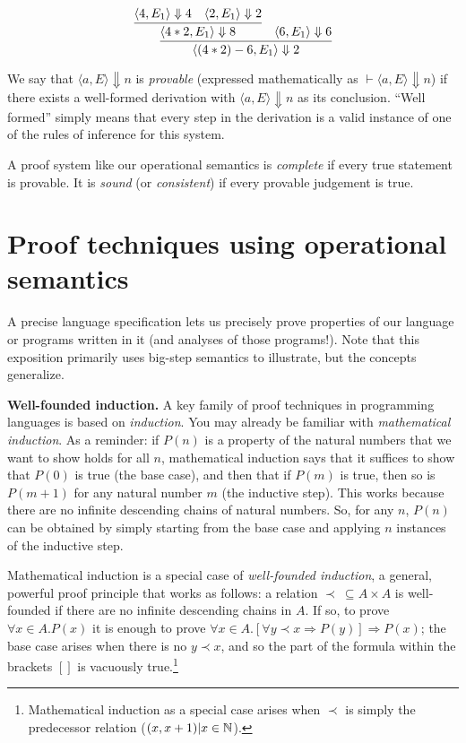 \documentclass[11pt]{article}
\begin{document}
\begin{equation*}
\infer{\langle (4 * 2) - 6, E_1 \rangle \Downarrow 2}
{\infer{\langle 4 * 2, E_1 \rangle \Downarrow 8}{\langle 4,E_1 \rangle \Downarrow 4& \langle 2,E_1 \rangle \Downarrow 2}
& \langle 6, E_1 \rangle \Downarrow 6}
\end{equation*}

We say that $\langle a, E \rangle \Downarrow n$ is \emph{provable} (expressed
mathematically as $\vdash \langle a,E \rangle \Downarrow n$) if there exists a
well-formed derivation with $\langle a, E \rangle \Downarrow n$ as its
conclusion.  ``Well formed'' simply means that every step in the derivation is a
valid instance of one of the rules of inference for this system.

A proof system like our operational semantics is \emph{complete} if every true
statement is provable.  It is \emph{sound} (or \emph{consistent}) if every
provable judgement is true.
%

\section{Proof techniques using operational semantics}

A precise language specification lets us precisely prove properties of our
language or programs written in it (and analyses of those programs!).  Note that
this exposition primarily uses big-step semantics to illustrate, but the concepts
generalize. 

\vspace{1ex}
\noindent\textbf{Well-founded induction.}
A key family of proof techniques in programming languages is based on
\emph{induction}.  You may already be familiar with \emph{mathematical
  induction}. As a reminder: if $P(n)$ is a property of the natural numbers that
we want to show holds for all $n$, mathematical induction says that it suffices
to show that $P(0)$ is true (the base case), and then that if $P(m)$ is true,
then so is $P(m + 1)$ for any natural number $m$ (the inductive step). This
works because there are no infinite descending chains of natural numbers.  So,
for any $n$, $P(n)$ can be obtained by simply starting from the base case and
applying $n$ instances of the inductive step.

Mathematical induction is a special case of \emph{well-founded induction}, a
general, powerful proof principle that works as follows: a relation $\prec \ 
\subseteq A \times A$ is well-founded if there are no infinite descending chains
in $A$.  If so, to prove $\forall x \in A. P(x)$ it is enough to prove $\forall
x \in A. [\forall y \prec x \Rightarrow P(y)] \Rightarrow
P(x)$; the base case arises when there is no $y \prec x$, and so the part of the formula within the brackets $[]$ is vacuously true.\footnote{Mathematical induction as a special case arises when $\prec$
  is simply the predecessor relation (${(x, x + 1) | x \in \mathbb{N}}$).}
\end{document}
